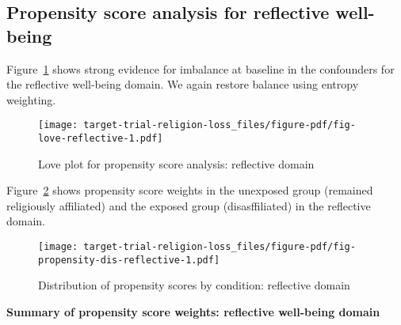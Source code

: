 \documentclass[
  singlecolumn]{report}
\begin{document}
\hypertarget{propensity-score-analysis-for-reflective-well-being}{%
\subsection{Propensity score analysis for reflective
well-being}\label{propensity-score-analysis-for-reflective-well-being}}

Figure~\ref{fig-love-reflective} shows strong evidence for imbalance at
baseline in the confounders for the reflective well-being domain. We
again restore balance using entropy weighting.

\begin{figure}

{\centering \texttt{[image: target-trial-religion-loss\_files/figure-pdf/fig-love-reflective-1.pdf]}

}

\caption{\label{fig-love-reflective}Love plot for propensity score
analysis: reflective domain}

\end{figure}

Figure~\ref{fig-propensity-dis-reflective} shows propensity score
weights in the unexposed group (remained religiously affiliated) and the
exposed group (disasffiliated) in the reflective domain.

\begin{figure}

{\centering \texttt{[image: target-trial-religion-loss\_files/figure-pdf/fig-propensity-dis-reflective-1.pdf]}

}

\caption{\label{fig-propensity-dis-reflective}Distribution of propensity
scores by condition: reflective domain}

\end{figure}

\textbf{Summary of propensity score weights: reflective well-being
domain}
\end{document}
